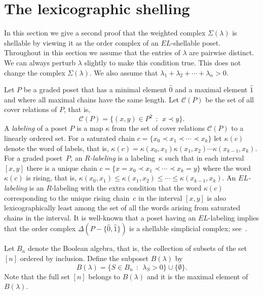 \documentclass[10pt]{amsart}
\theoremstyle{definition}
\newcommand{\hz}{\hat{0}}
\newcommand{\ho}{\hat{1}}
\newcommand{\coveredby}{\prec}
\newcommand{\lambdasumpositive}
{\lambda_{1} + \lambda_{2} + \cdots + \lambda_{n} > 0}
\begin{document}
\section{The lexicographic shelling}
\label{section_lexicographic_shelling}


In this section we give a second proof that the weighted complex
$\Sigma(\lambda)$ is shellable by viewing it as the order
complex of an $EL$-shellable poset.
Throughout in this section we assume that the entries of $\lambda$
are pairwise distinct. We can always perturb $\lambda$
slightly to make this condition true. This does not
change the complex $\Sigma(\lambda)$.
We also assume that $\lambdasumpositive$.



Let $P$ be a graded poset  that 
has a minimal element $\hz$ and a maximal element $\ho$
and where all maximal chains have the same length.
Let $\mathcal{C}(P)$ be the set of all cover relations of $P$,
that is,
$$ \mathcal{C}(P) = \{(x,y) \in P^{2} \:\: : \:\: x \coveredby y\} . $$
A \emph{labeling} of a poset $P$ is a map
$\kappa$ from the set of cover relations $\mathcal{C}(P)$
to a linearly ordered set.
For a saturated chain
$c = \{x_{0} \coveredby x_{1} \coveredby \cdots \coveredby x_{k}\}$
let $\kappa(c)$
denote the word of labels, that is,
$\kappa(c) = 
\kappa(x_{0},x_{1}) \kappa(x_{1},x_{2}) \cdots \kappa(x_{k-1},x_{k})$.
For a graded poset~$P$,
an \emph{$R$-labeling} is a labeling~$\kappa$
such that in each interval $[x,y]$ there is a unique chain
$c = \{x = x_{0} \coveredby x_{1} \coveredby \cdots \coveredby x_{k} = y\}$
where the word $\kappa(c)$ is rising, that is,
$\kappa(x_{0},x_{1}) \leq \kappa(x_{1},x_{2}) \leq \cdots \leq
\kappa(x_{k-1},x_{k})$.
An \emph{$EL$-labeling} is an $R$-labeling with the extra condition
that the word $\kappa(c)$
corresponding to the
unique rising chain~$c$ in the interval $[x,y]$
is also lexicographically least
among the set of
all the words arising from saturated chains in the interval.
It is
well-known that
a poset
having an $EL$-labeling
implies that the order complex $\Delta(P - \{\hz,\ho\})$
is a shellable simplicial complex; see~\cite[Section~2]{Bjorner}.



Let $B_{n}$ denote the Boolean algebra,
that is, the collection of subsets of the set $[n]$
ordered by inclusion.
Define the subposet $B(\lambda)$
by 
$$ B(\lambda) = \{ S \in B_{n} \:\: : \:\: \lambda_{S} > 0\} \cup \{\emptyset\}. $$
Note that the full set $[n]$
belongs to $B(\lambda)$ and it is the maximal element of $B(\lambda)$.
\end{document}
